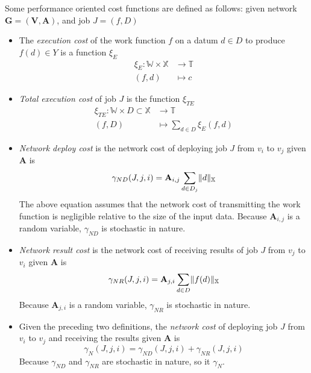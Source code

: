 \documentclass[../mthe-493-project-proposal.tex]{subfiles}
\begin{document}
    Some performance oriented cost functions are defined as follows: given network $\mathbf{G} = (\mathbf{V}, \mathbf{A})$, and job $J = (f, D)$

    \begin{itemize}
        \item The \textit{execution cost} of the work function $f$ on a datum $d \in D$ to      produce $f(d) \in Y$ is a function $\xi_E$
              \begin{align*}
                  \xi_E \colon \mathbb{W} \times \mathbb{X} &\to \mathbb{T} \\
                  (f, d)                                    &\mapsto c
              \end{align*}

        \item \textit{Total execution cost} of job $J$ is the function $\xi_{TE}$
              \begin{align*}
                  \xi_{TE} \colon \mathbb{W} \times D \subset \mathbb{X} &\to \mathbb{T}                            \\
                  (f, D)                                                 &\mapsto \sum\limits_{d \in D} \xi_E(f, d)
              \end{align*}

        \item \textit{Network deploy cost} is the network cost of deploying job $J$ from $v_i$ to $v_j$ given $\mathbf{A}$ is
              \begin{equation*}
                  \gamma_{ND}(J, j, i) = \mathbf{A}_{i,j} \sum\limits_{d \in D_j} \lVert d\rVert_{\mathbb{X}}
              \end{equation*}
              The above equation assumes that the network cost of transmitting the work function is negligible relative to the size of the input data. Because $\mathbf{A}_{i,j}$ is a random variable, $\gamma_{ND}$ is stochastic in nature.

        \item \textit{Network result cost} is the network cost of receiving results of job $J$ from     $v_j$ to $v_i$ given $\mathbf{A}$ is
              \begin{equation*}
                  \gamma_{NR}(J, j, i) = \mathbf{A}_{j,i} \sum\limits_{d \in D} \lVert f(d)\rVert_{\mathbb{X}}
              \end{equation*}
              Because $\mathbf{A}_{j,i}$ is a random variable, $\gamma_{NR}$ is stochastic in nature.

        \item Given the preceding two definitions, the \textit{network cost} of deploying job $J$ from $v_i$ to $v_j$ and receiving the results  given $\mathbf{A}$ is
              \begin{equation*}
                  \gamma_N(J, j, i) = \gamma_{ND}(J, j, i) + \gamma_{NR}(J, j, i)
              \end{equation*}
              Because $\gamma_{ND}$ and $\gamma_{NR}$ are stochastic in nature, so it $\gamma_N$.
    \end{itemize}
\end{document}
